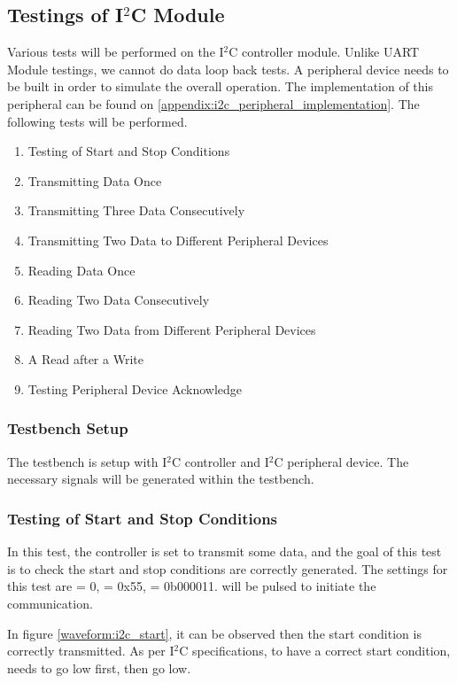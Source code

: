 \newpage
\subsection{Testings of I$^2$C Module}
Various tests will be performed on the I$^2$C controller module. Unlike UART Module testings, we cannot do data loop back tests. A peripheral device needs to be built in order to simulate the overall operation. The implementation of this peripheral can be found on \ref{appendix:i2c_peripheral_implementation}. The following tests will be performed.
\begin{enumerate}
	\item Testing of Start and Stop Conditions
	\item Transmitting Data Once
	\item Transmitting Three Data Consecutively
	\item Transmitting Two Data to Different Peripheral Devices
	\item Reading Data Once
	\item Reading Two Data Consecutively
	\item Reading Two Data from Different Peripheral Devices
	\item A Read after a Write
	\item Testing Peripheral Device Acknowledge
\end{enumerate}

\subsubsection{Testbench Setup}
The testbench is setup with I$^2$C controller and I$^2$C peripheral device. The necessary signals will be generated within the testbench.


\subsubsection{Testing of Start and Stop Conditions}
In this test, the controller is set to transmit some data, and the goal of this test is to check the start and stop conditions are correctly generated. The settings for this test are  = 0,  = 0x55,  = 0b000011.  will be pulsed to initiate the communication.

In figure \ref{waveform:i2c_start}, it can be observed then the start condition is correctly transmitted. As per I$^2$C specifications, to have a correct start condition,  needs to go low first, then  go low.

